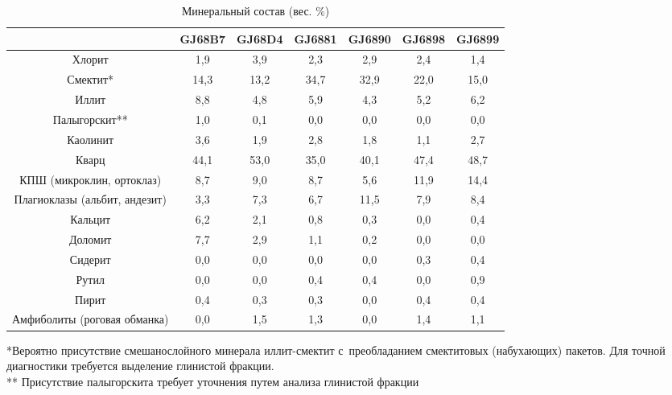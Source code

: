 \begin{table}[]
  \small
    \centering
  \begin{threeparttable}
  \caption{Минеральный состав (вес. \%)}
  \label{tab:mineral}
    \begin{tabular}{|c|c|c|c|c|c|c|}
        \hline
                                  & GJ68B7 & GJ68D4 & GJ6881 & GJ6890 & GJ6898 & GJ6899 \\ \hline
    Хлорит                        & 1,9  & 3,9  & 2,3  & 2,9  & 2,4  & 1,4  \\ \hline
    Смектит*                       & 14,3 & 13,2 & 34,7 & 32,9 & 22,0 & 15,0 \\ \hline
    Иллит                         & 8,8  & 4,8  & 5,9  & 4,3  & 5,2  & 6,2  \\ \hline
    Палыгорскит**                   & 1,0  & 0,1  & 0,0  & 0,0  & 0,0  & 0,0  \\ \hline
    Каолинит                      & 3,6  & 1,9  & 2,8  & 1,8  & 1,1  & 2,7  \\ \hline
    Кварц                         & 44,1 & 53,0 & 35,0 & 40,1 & 47,4 & 48,7 \\ \hline
    КПШ (микроклин, ортоклаз)     & 8,7  & 9,0  & 8,7  & 5,6  & 11,9 & 14,4 \\ \hline
    Плагиоклазы (альбит, андезит) & 3,3  & 7,3  & 6,7  & 11,5 & 7,9  & 8,4  \\ \hline
    Кальцит                       & 6,2  & 2,1  & 0,8  & 0,3  & 0,0  & 0,4  \\ \hline
    Доломит                       & 7,7  & 2,9  & 1,1  & 0,2  & 0,0  & 0,0  \\ \hline
    Сидерит                       & 0,0  & 0,0  & 0,0  & 0,0  & 0,3  & 0,4  \\ \hline
    Рутил                         & 0,0  & 0,0  & 0,4  & 0,4  & 0,0  & 0,9  \\ \hline
    Пирит                         & 0,4  & 0,3  & 0,3  & 0,0  & 0,4  & 0,4  \\ \hline
    Амфиболиты (роговая обманка)  & 0,0  & 1,5  & 1,3  & 0,0  & 1,4  & 1,1  \\ \hline
    \end{tabular}
    \raggedright 
    *Вероятно присутствие смешанослойного минерала иллит-смектит с~преобладанием смектитовых 
    (набухающих) пакетов. 
    Для точной диагностики требуется выделение глинистой фракции.
    \\
    ** Присутствие палыгорскита требует уточнения путем анализа глинистой фракции
    \end{threeparttable}
    \end{table}

